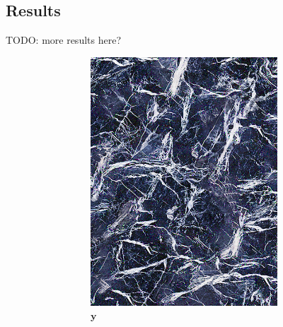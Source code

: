 \subsection{Results}
\label{section:results-experiments-02-results}

{\color{red} TODO: more results here?}

\begin{figure}[]
    \centering    
    \begin{subfigure}{\textwidth}
        \centering
        \begin{subfigure}{0.24\textwidth}
            \centering
            \includegraphics[width=\textwidth]{images/04-experiment02/human/marble/target.jpg}
            \caption*{\(\bm{y}\)}
        \end{subfigure}
        \hfill
        \begin{subfigure}{0.24\textwidth}
            \centering

\end{subfigure}
\end{subfigure}
\end{figure}
